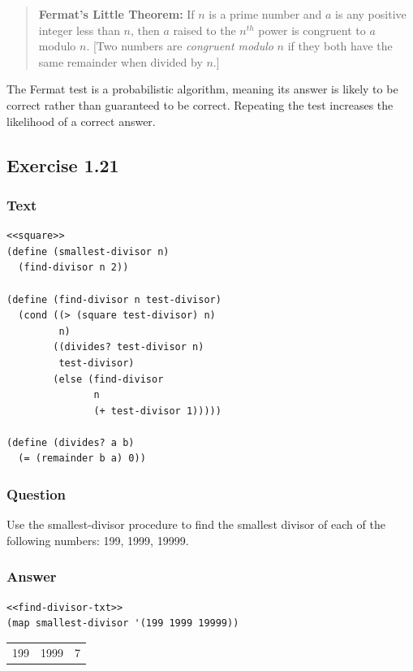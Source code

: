 \documentclass[final,fleqn,titlepage,twoside]{article}
\begin{document}
\begin{quote}
\textbf{Fermat's Little Theorem:} If \(n\) is a prime number and \(a\) is any
 positive integer less than \(n\), then \(a\) raised to the \(n^{th}\) power
 is congruent to \(a\) modulo \(n\). [Two numbers are \emph{congruent modulo} \(n\)
 if they both have the same remainder when divided by \(n\).]
\end{quote}

The Fermat test is a probabilistic algorithm, meaning its answer is likely to be
correct rather than guaranteed to be correct. Repeating the test increases the
likelihood of a correct answer.

\subsection{Exercise 1.21}
\label{sec:org3e60c1c}
\subsubsection{Text}
\label{sec:orgd2544f5}
\begin{verbatim}
<<square>>
(define (smallest-divisor n)
  (find-divisor n 2))

(define (find-divisor n test-divisor)
  (cond ((> (square test-divisor) n) 
         n)
        ((divides? test-divisor n) 
         test-divisor)
        (else (find-divisor 
               n 
               (+ test-divisor 1)))))

(define (divides? a b)
  (= (remainder b a) 0))
\end{verbatim}

\subsubsection{Question}
\label{sec:orgbe31b80}
Use the smallest-divisor procedure to find the smallest divisor of each of the
following numbers: 199, 1999, 19999.

\subsubsection{Answer}
\label{sec:orgb19d988}
\begin{verbatim}
<<find-divisor-txt>>
(map smallest-divisor '(199 1999 19999))
\end{verbatim}

\begin{center}
\begin{tabular}{rrr}
199 & 1999 & 7\\[0pt]
\end{tabular}
\end{center}
\end{document}
